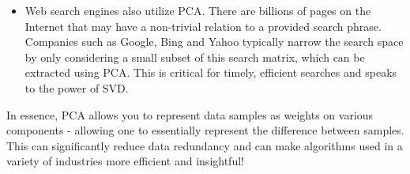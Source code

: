 \documentclass{article}
\begin{document}
\begin{itemize}
\item Web search engines also utilize PCA. There are billions of pages on the Internet that may have a non-trivial relation to a provided search phrase. Companies such as Google, Bing and Yahoo typically narrow the search space by only considering a small subset of this search matrix, which can be extracted using PCA\cite{search-clustering}. This is critical for timely, efficient searches and speaks to the power of SVD.
\end{itemize}

In essence, PCA allows you to represent data samples as weights on various components - allowing one to essentially represent the difference between samples. This can significantly reduce data redundancy and can make algorithms used in a variety of industries more efficient and insightful!

\small


\end{document}
